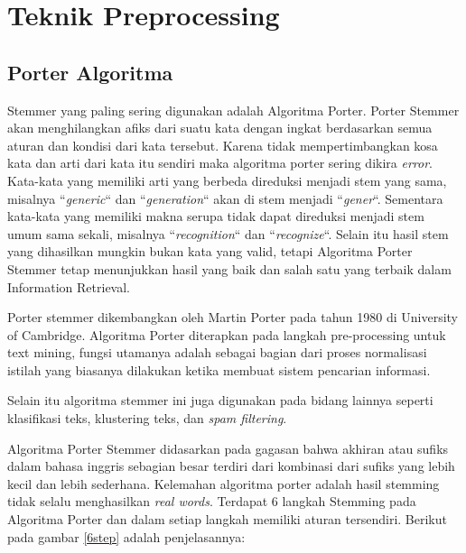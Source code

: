 \section{Teknik Preprocessing}
    \subsection{Porter Algoritma}
        Stemmer yang paling sering digunakan adalah Algoritma Porter. 
        Porter Stemmer akan menghilangkan afiks dari suatu kata dengan ingkat berdasarkan semua aturan dan kondisi dari kata tersebut. 
        Karena tidak mempertimbangkan kosa kata dan arti dari kata itu sendiri maka algoritma porter sering dikira \textit{error}. 
        Kata-kata yang memiliki arti yang berbeda direduksi menjadi stem yang sama, misalnya ``\textit{generic}`` dan ``\textit{generation}`` akan di stem menjadi ``\textit{gener}``. 
        Sementara kata-kata yang memiliki makna serupa tidak dapat direduksi menjadi stem umum sama sekali, misalnya ``\textit{recognition}`` dan ``\textit{recognize}``. 
        Selain itu hasil stem yang dihasilkan mungkin bukan kata yang valid, tetapi Algoritma Porter Stemmer tetap menunjukkan hasil yang baik dan salah satu yang terbaik dalam Information Retrieval.
        \par Porter stemmer dikembangkan oleh Martin Porter pada tahun 1980 di University of Cambridge. 
        Algoritma Porter diterapkan pada langkah pre-processing untuk text mining, fungsi utamanya adalah sebagai bagian dari proses normalisasi istilah yang biasanya dilakukan ketika membuat sistem pencarian informasi. 
        \par Selain itu algoritma stemmer ini juga digunakan pada bidang lainnya seperti klasifikasi teks, klustering teks, dan \textit{spam filtering}. 
        \par Algoritma Porter Stemmer didasarkan pada gagasan bahwa akhiran atau sufiks dalam bahasa inggris sebagian besar terdiri dari kombinasi dari sufiks yang lebih kecil dan lebih sederhana. 
        Kelemahan algoritma porter adalah hasil stemming tidak selalu menghasilkan \textit{real words}.
        Terdapat 6 langkah Stemming pada Algoritma Porter dan dalam setiap langkah memiliki aturan tersendiri. Berikut pada gambar \ref{6step} adalah penjelasannya:
       
